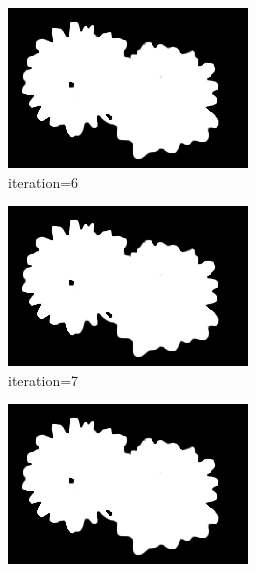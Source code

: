 \documentclass{article}
\begin{document}
\begin{figure}[t]
\begin{subfigure}[t]{0.19\textwidth}
\includegraphics[width=\textwidth]{./images/marginals_iter_6.png}
\vspace{-0.6cm}
\caption{iteration=6}
\end{subfigure}
\begin{subfigure}[t]{0.19\textwidth}
\centering
\includegraphics[width=\textwidth]{./images/marginals_iter_7.png}
\vspace{-0.6cm}
\caption{iteration=7}
\end{subfigure}
\begin{subfigure}[t]{0.19\textwidth}
\centering
\includegraphics[width=\textwidth]{./images/marginals_iter_8.png}

\end{subfigure}
\end{figure}
\end{document}
